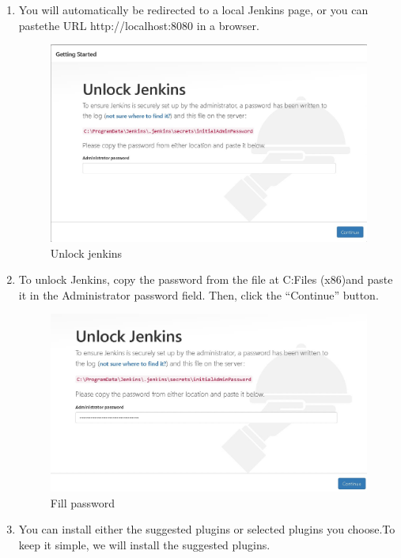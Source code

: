 \documentclass[12pt]{article}
\begin{document}
\begin{enumerate}
\item You will automatically be redirected to a local Jenkins page, or you can pastethe
URL http://localhost:8080 in a browser.
\begin{figure}[H]
\centering
\includegraphics[scale=0.5]{fig56}
\caption{Unlock jenkins}
\vspace{0.6\baselineskip}
\end{figure}

\item To unlock Jenkins, copy the password from the file at C:Files (x86)and paste it
in the Administrator password field. Then, click the “Continue” button.

\begin{figure}[H]
\centering
\includegraphics[scale=0.5]{fig57}
\caption{Fill password}
\vspace{0.6\baselineskip}
\end{figure}

\item You can install either the suggested plugins or selected plugins you choose.To keep
it simple, we will install the suggested plugins.


\end{enumerate}
\end{document}
